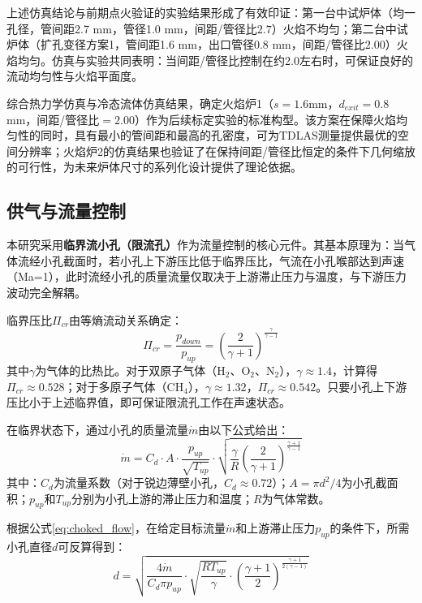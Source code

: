 上述仿真结论与前期点火验证的实验结果形成了有效印证：第一台中试炉体（均一孔径，管间距2.7 mm，管径1.0 mm，间距/管径比$2.7$）火焰不均匀；第二台中试炉体（扩孔变径方案1，管间距1.6 mm，出口管径0.8 mm，间距/管径比$2.00$）火焰均匀。仿真与实验共同表明：当间距/管径比控制在约2.0左右时，可保证良好的流动均匀性与火焰平面度。

综合热力学仿真与冷态流体仿真结果，确定火焰炉1（$s=1.6$mm，$d_{exit}=0.8$mm，间距/管径比$=2.00$）作为后续标定实验的标准构型。该方案在保障火焰均匀性的同时，具有最小的管间距和最高的孔密度，可为TDLAS测量提供最优的空间分辨率；火焰炉2的仿真结果也验证了在保持间距/管径比恒定的条件下几何缩放的可行性，为未来炉体尺寸的系列化设计提供了理论依据。

\subsection{供气与流量控制}

本研究采用\textbf{临界流小孔（限流孔）}作为流量控制的核心元件。其基本原理为：当气体流经小孔截面时，若小孔上下游压比低于临界压比，气流在小孔喉部达到声速（Ma=1），此时流经小孔的质量流量仅取决于上游滞止压力与温度，与下游压力波动完全解耦。

临界压比$\Pi_{cr}$由等熵流动关系确定：
\begin{equation}
	\Pi_{cr} = \frac{p_{down}}{p_{up}} = \left( \frac{2}{\gamma + 1} \right)^{\frac{\gamma}{\gamma - 1}}
	\label{eq:critical_pressure}
\end{equation}
其中$\gamma$为气体的比热比。对于双原子气体（H$_2$、O$_2$、N$_2$），$\gamma \approx 1.4$，计算得$\Pi_{cr} \approx 0.528$；对于多原子气体（CH$_4$），$\gamma \approx 1.32$，$\Pi_{cr} \approx 0.542$。只要小孔上下游压比小于上述临界值，即可保证限流孔工作在声速状态。

在临界状态下，通过小孔的质量流量$\dot{m}$由以下公式给出：
\begin{equation}
	\dot{m} = C_d \cdot A \cdot \frac{p_{up}}{\sqrt{T_{up}}} \cdot \sqrt{\frac{\gamma}{R} \left( \frac{2}{\gamma + 1} \right)^{\frac{\gamma + 1}{\gamma - 1}}}
	\label{eq:choked_flow}
\end{equation}
其中：$C_d$为流量系数（对于锐边薄壁小孔，$C_d \approx 0.72$）；$A = \pi d^2 / 4$为小孔截面积；$p_{up}$和$T_{up}$分别为小孔上游的滞止压力和温度；$R$为气体常数。

根据公式\eqref{eq:choked_flow}，在给定目标流量$\dot{m}$和上游滞止压力$p_{up}$的条件下，所需小孔直径$d$可反算得到：
\begin{equation}
	d = \sqrt{\frac{4\dot{m}}{C_d \pi p_{up}} \cdot \sqrt{\frac{R T_{up}}{\gamma}} \cdot \left( \frac{\gamma + 1}{2} \right)^{\frac{\gamma + 1}{2(\gamma - 1)}}}
	\label{eq:orifice_diameter}
\end{equation}

